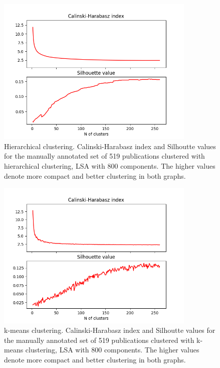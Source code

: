 \begin{figure}[ht]
  \begin{center}    
\includegraphics[width=9.5cm]{images/c-h-silh-index-plot-519-2_260-800-hierarchical.png}
    \caption{Hierarchical clustering. Calinski-Harabasz index and Silhoutte values for the
    manually annotated set of 519 publications clustered with hierarchical
    clustering, LSA with 800 components. The higher values denote 
    more compact and better clustering in both graphs.}
    \label{fig:ch-silh01}
  \end{center}
\end{figure}


\begin{figure}[ht]
  \begin{center}    
\includegraphics[width=9.5cm]{images/c-h-silh-index-plot-519-2_260-800-kmeans.png}
    \caption{k-means clustering. Calinski-Harabasz index and Silhoutte values for the
    manually annotated set of 519 publications clustered with k-means 
    clustering, LSA with 800 components. The higher values denote 
    more compact and better clustering in both graphs.}
    \label{fig:ch-silh02}
  \end{center}
\end{figure}

